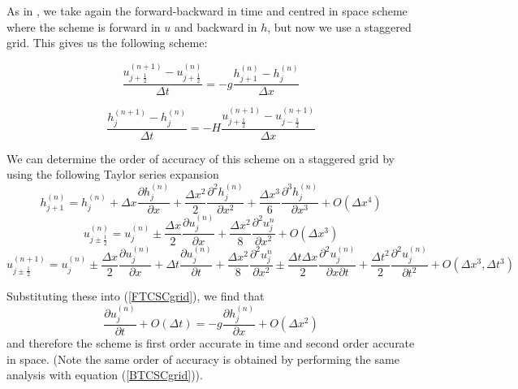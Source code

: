 \documentclass[a4paper, 10.8pt, notitlepage]{article}
\begin{document}
As in \cite{MPE textbook}, we take again the forward-backward in time and centred in space scheme where the scheme is forward in $u$ and backward in $h$, but now we use a staggered grid. This gives us the following scheme:

\begin{equation}\label{FTCSCgrid}
\frac{u_{j+ \frac{1}{2}}^{(n+1)} - u_{j + \frac{1}{2}}^{(n)}}{\Delta t} = -g \frac{h_{j+1}^{(n)} - h_{j}^{(n)}}{\Delta x}
\end{equation}

\begin{equation}\label{BTCSCgrid}
\frac{h_{j}^{(n+1)} - h_{j}^{(n)}}{\Delta t} = -H \frac{u_{j+\frac{1}{2}}^{(n+1)} - u_{j-\frac{1}{2}}^{(n+1)}}{\Delta x}
\end{equation}


We can determine the order of accuracy of this scheme on a staggered grid by using the following Taylor series expansion 
\begin{equation}
h_{j + 1}^{(n)} = h_{j}^{(n)} + \Delta x  \frac{\partial h_{j}^{(n)}}{\partial x} + \frac{\Delta x^{2}}{2}\frac{\partial^{2} h_{j}^{(n)}}{\partial x^{2}} + \frac{\Delta x^{3}}{6}\frac{\partial^{3} h_{j}^{(n)}}{\partial x^{3}} + O(\Delta x^{4})
\end{equation}
\begin{equation} \label{uj+1/2n}
u_{j \pm \frac{1}{2}}^{(n)} = u_{j}^{(n)} \pm \frac{\Delta x}{2}\frac{\partial u_{j}^{(n)}}{\partial x} + \frac{\Delta x^{2}}{8}\frac{\partial^{2}u_{j}^{n}}{\partial x^{2}} + O(\Delta x^{3})
\end{equation}
\begin{equation} \label{uj+1/2n+1}
u_{j \pm \frac{1}{2}}^{(n + 1)} = u_{j}^{(n)} \pm \frac{\Delta x}{2}\frac{\partial u_{j}^{(n)}}{\partial x} + \Delta t \frac{\partial u_{j}^{(n)}}{\partial t} + \frac{\Delta x^{2}}{8}\frac{\partial^{2}u_{j}^{n}}{\partial x^{2}} \pm \frac{\Delta t \Delta x}{2}\frac{\partial^{2} u_{j}^{(n)}}{\partial x \partial t} + \frac{\Delta t^{2}}{2} \frac{\partial ^{2} u_{j}^{(n)}}{\partial t ^{2}} + O(\Delta x^{3}, \Delta t^{3})
\end{equation}

Substituting these into (\ref{FTCSCgrid}), we find that 
\begin{equation}
\frac{\partial u_{j}^{(n)}}{\partial t} + O(\Delta t) =  -g \frac{\partial h_{j}^{(n)}}{\partial x} + O(\Delta x^{2})
\end{equation} 
and therefore the scheme is first order accurate in time and second order accurate in space. (Note the same order of accuracy is obtained by performing the same analysis with equation (\ref{BTCSCgrid})).
\end{document}

